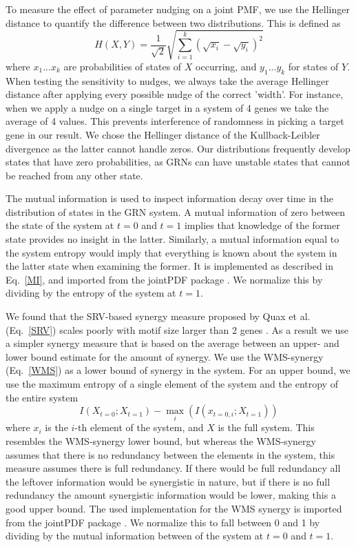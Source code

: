 \documentclass[../main.tex]{subfiles}
\begin{document}
To measure the effect of parameter nudging on a joint PMF, we use the Hellinger distance to quantify the difference between two distributions.
This is defined as
%
\begin{equation}
H(X, Y) = \frac{1}{\sqrt{2}} \sqrt{\sum^k_{i=1} (\sqrt{x_i} - \sqrt{y_i})^2}
\end{equation}
%
where ${x_1 ... x_k}$ are probabilities of states of $X$ occurring, and ${y_1 ... y_k}$ for states of $Y$.
When testing the sensitivity to nudges, we always take the average Hellinger distance after applying every possible nudge of the correct 'width'.
For instance, when we apply a nudge on a single target in a system of 4 genes we take the average of 4 values.
This prevents interference of randomness in picking a target gene in our result.
We chose the Hellinger distance of the Kullback-Leibler divergence as the latter cannot handle zeros.
Our distributions frequently develop states that have zero probabilities, as GRNs can have unstable states that cannot be reached from any other state.

The mutual information is used to inspect information decay over time in the distribution of states in the GRN system.
A mutual information of zero between the state of the system at $t=0$ and $t=1$ implies that knowledge of the former state provides no insight in the latter.
Similarly, a mutual information equal to the system entropy would imply that everything is known about the system in the latter state when examining the former.
It is implemented as described in Eq.~\ref{MI}, and imported from the jointPDF package \cite{jointpdf}.
We normalize this by dividing by the entropy of the system at $t = 1$.

We found that the SRV-based synergy measure proposed by Quax et al. (Eq.~\ref{SRV}) scales poorly with motif size larger than 2 genes \cite{quax2017quantifying}.
As a result we use a simpler synergy measure that is based on the average between an upper- and lower bound estimate for the amount of synergy.
We use the WMS-synergy (Eq.~\ref{WMS}) as a lower bound of synergy in the system.
For an upper bound, we use the maximum entropy of a single element of the system and the entropy of the entire system
%
\begin{equation}
I(X_{t=0}; X_{t=1}) - \max_i (I(x_{t=0,i};X_{t=1}))
\end{equation}
%
where $x_i$ is the $i$-th element of the system, and $X$ is the full system.
This resembles the WMS-synergy lower bound, but whereas the WMS-synergy assumes that there is no redundancy between the elements in the system, this measure assumes there is full redundancy.
If there would be full redundancy all the leftover information would be synergistic in nature, but if there is no full redundancy the amount synergistic information would be lower, making this a good upper bound.
The used implementation for the WMS synergy is imported from the jointPDF package \cite{jointpdf}.
We normalize this to fall between 0 and 1 by dividing by the mutual information between of the system at $t = 0$ and $t = 1$.
\end{document}
